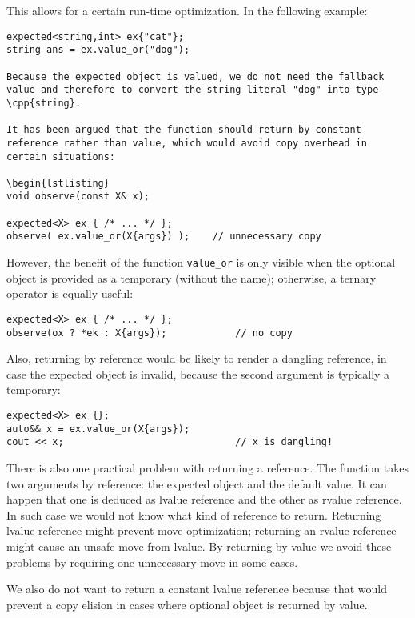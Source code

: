 \documentclass[a4paper,10pt]{article}
\newcommand{\cpp}[1]{\lstinline{#1}}
\begin{document}
This allows for a certain run-time optimization. In the following example:

\begin{lstlisting}
expected<string,int> ex{"cat"};
string ans = ex.value_or("dog");

Because the expected object is valued, we do not need the fallback value and therefore to convert the string literal "dog" into type \cpp{string}.

It has been argued that the function should return by constant reference rather than value, which would avoid copy overhead in certain situations:

\begin{lstlisting}
void observe(const X& x);

expected<X> ex { /* ... */ };
observe( ex.value_or(X{args}) );    // unnecessary copy
\end{lstlisting}

However, the benefit of the function \cpp{value_or} is only visible when the optional object is provided as a temporary (without the name); otherwise, a ternary operator is equally useful:

\begin{lstlisting}
expected<X> ex { /* ... */ };
observe(ox ? *ek : X{args});            // no copy
\end{lstlisting}

Also, returning by reference would be likely to render a dangling reference, in case the expected object is invalid, because the second argument is typically a temporary:

\begin{lstlisting}
expected<X> ex {};
auto&& x = ex.value_or(X{args});
cout << x;                              // x is dangling!
\end{lstlisting}

There is also one practical problem with returning a reference. The function takes two arguments by reference: the expected object and the default value. It can happen that one is deduced as lvalue reference and the other as rvalue reference. In such case we would not know what kind of reference to return. Returning lvalue reference might prevent move optimization; returning an rvalue reference might cause an unsafe move from lvalue. By returning by value we avoid these problems by requiring one unnecessary move in some cases.

We also do not want to return a constant lvalue reference because that would prevent a copy elision in cases where optional object is returned by value.
\end{document}
